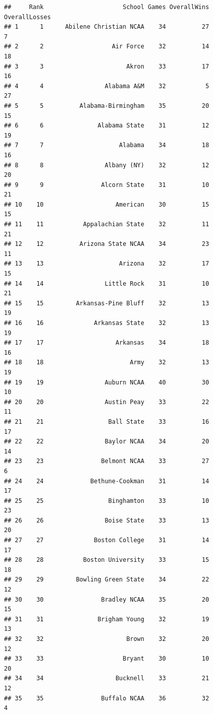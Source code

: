 \documentclass[]{book}
\begin{document}
\begin{verbatim}
##     Rank                      School Games OverallWins OverallLosses
## 1      1      Abilene Christian NCAA    34          27             7
## 2      2                   Air Force    32          14            18
## 3      3                       Akron    33          17            16
## 4      4                 Alabama A&M    32           5            27
## 5      5          Alabama-Birmingham    35          20            15
## 6      6               Alabama State    31          12            19
## 7      7                     Alabama    34          18            16
## 8      8                 Albany (NY)    32          12            20
## 9      9                Alcorn State    31          10            21
## 10    10                    American    30          15            15
## 11    11           Appalachian State    32          11            21
## 12    12          Arizona State NCAA    34          23            11
## 13    13                     Arizona    32          17            15
## 14    14                 Little Rock    31          10            21
## 15    15         Arkansas-Pine Bluff    32          13            19
## 16    16              Arkansas State    32          13            19
## 17    17                    Arkansas    34          18            16
## 18    18                        Army    32          13            19
## 19    19                 Auburn NCAA    40          30            10
## 20    20                 Austin Peay    33          22            11
## 21    21                  Ball State    33          16            17
## 22    22                 Baylor NCAA    34          20            14
## 23    23                Belmont NCAA    33          27             6
## 24    24             Bethune-Cookman    31          14            17
## 25    25                  Binghamton    33          10            23
## 26    26                 Boise State    33          13            20
## 27    27              Boston College    31          14            17
## 28    28           Boston University    33          15            18
## 29    29         Bowling Green State    34          22            12
## 30    30                Bradley NCAA    35          20            15
## 31    31               Brigham Young    32          19            13
## 32    32                       Brown    32          20            12
## 33    33                      Bryant    30          10            20
## 34    34                    Bucknell    33          21            12
## 35    35                Buffalo NCAA    36          32             4

\end{verbatim}
\end{document}
